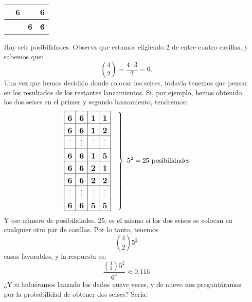 \begin{itemize}
\begin{Ejemplo}
\begin{center}
\begin{tabular}{|c|c|c|c|}
            \hline
             \rule{0cm}{0.5cm}&\mbox{\large\bf 6}& &\mbox{\large\bf 6}\\
            \hline
             \rule{0cm}{0.5cm}&& \mbox{\large\bf 6}&\mbox{\large\bf 6}\\
             \hline
             \end{tabular}
             \end{center}
             Hay seis posibilidades. Observa que estamos eligiendo 2 de entre cuatro casillas, y sabemos que:
             \[\binom{4}{2}=\dfrac{4\cdot 3}{2}=6.\]
             Una vez que hemos decidido donde colocar los seises, todavía tenemos que pensar en los resultados de los restantes lanzamientos. Si, por ejemplo, hemos obtenido los dos seises en el primer y segundo lanzamiento, tendremos:
            \[
            \left.\begin{array}{|c|c|c|c|}
            \hline
             \rule{0cm}{0.5cm}\mbox{\large\bf 6}&\mbox{\large\bf 6}&\mbox{\large\bf 1}&\mbox{\large\bf 1}\\
            \hline
            \rule{0cm}{0.5cm}\mbox{\large\bf 6}&\mbox{\large\bf 6}&\mbox{\large\bf 1}&\mbox{\large\bf 2}\\
            \hline
            \rule{0cm}{0.5cm}\vdots&\vdots&\vdots&\vdots\\
            \hline
            \rule{0cm}{0.5cm}\mbox{\large\bf 6}&\mbox{\large\bf 6}&\mbox{\large\bf 1}&\mbox{\large\bf 5}\\
            \hline
            \rule{0cm}{0.5cm}\mbox{\large\bf 6}&\mbox{\large\bf 6}&\mbox{\large\bf 2}&\mbox{\large\bf 1}\\
            \hline
            \rule{0cm}{0.5cm}\mbox{\large\bf 6}&\mbox{\large\bf 6}&\mbox{\large\bf 2}&\mbox{\large\bf 2}\\
            \hline
            \rule{0cm}{0.5cm}\vdots&\vdots&\vdots&\vdots\\
            \rule{0cm}{0.5cm}\mbox{\large\bf 6}&\mbox{\large\bf 6}&\mbox{\large\bf 5}&\mbox{\large\bf 5}\\
            \hline
             \end{array}\quad\right\}\,\,5^2=25\mbox{ posibilidades}
             \]
             Y ese número de posibilidades, 25, es el mismo si los dos seises se colocan en cualquier otro par de casillas. Por lo tanto, tenemos
             \[\binom{4}{2}5^2\]
             casos favorables, y la respuesta es:
             \[\dfrac{\displaystyle\binom{4}{2}5^2}{6^4}\approx 0.116\]
             ¿Y si hubiéramos lanzado los dados nueve veces, y de nuevo nos preguntáramos por la probabilidad de obtener dos seises? Sería:

\end{Ejemplo}
\end{itemize}
